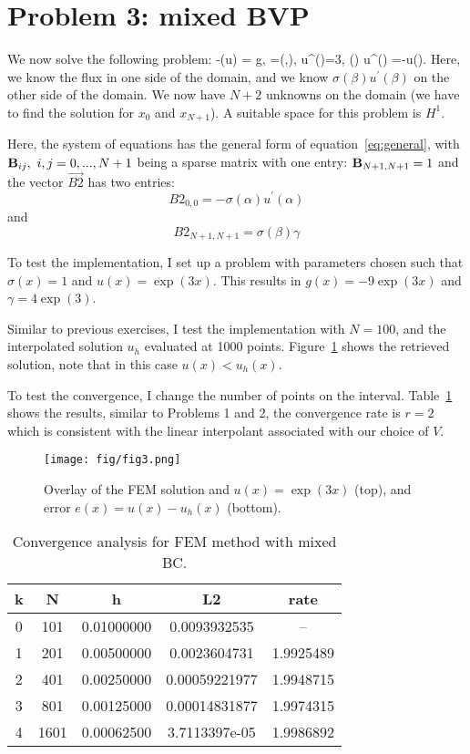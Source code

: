 \documentclass[10pt]{article}
\def\up#1{ #1^{\prime}}
\begin{document}
\section{Problem 3: mixed BVP}
We now solve the following problem:
\beq
-\nabla\cdot(\sigma\nabla u) = g, \Omega=(\alpha,\beta), \up{u}(\alpha)=3, \sigma(\beta)\up{u}(\beta) =\gamma -u(\beta).
\label{eq:Robin}
\eeq
Here, we know the flux in one side of the domain, and we know $\sigma(\beta)\up{u}(\beta)$ on the other side of the domain. 
We now have $N+2$ unknowns on the domain (we have to find the solution for $x_0$ and $x_{N+1}$). A suitable space
for this problem is $H^1$.

Here, the system of equations has the general form of equation~\ref{eq:general}, with 
${\bf B}_{ij},\text{  }i,j=0,...,N+1$ being a sparse matrix with one entry: ${\bf B}_{N+1,N+1} = 1$ 
and the vector $\vec{B2}$ has two entries:
\[
B2_{0,0} = -\sigma(\alpha)\up{u}(\alpha)
\]
and
\[
B2_{N+1,N+1} = \sigma(\beta)\gamma
\]


To test the implementation, I set up a problem with parameters chosen such that $\sigma(x)=1$ and $u(x) =\exp(3x)$. This
results in $g(x) = -9\exp(3x)$ and $\gamma=4\exp(3)$.

Similar to previous exercises, I test the implementation with $N=100$, and the interpolated solution $u_h$ evaluated
at 1000 points. Figure~\ref{fig:fig3} shows the retrieved solution, note that in this case $u(x) < u_h(x)$. 


To test the convergence, I change the number of points on the interval. Table~\ref{tab:table3} shows the results,
similar to Problems 1 and 2, the convergence rate is $r=2$ which is consistent with the linear interpolant
associated with our choice of $V$. 

\begin{figure}
\centering
\texttt{[image: fig/fig3.png]}
\caption{Overlay of the FEM solution and $u(x)= \exp(3x)$ (top), and error $e(x) = u(x)-u_h(x)$ (bottom).}
\label{fig:fig3}
\end{figure}

\begin{table}
\centering
  \begin{tabular}{c | c | c | c | c}
k&   N &      h    &     L2    &     rate      \\ \hline
0&  101& 0.01000000& 0.0093932535&    --       \\ 
1&  201& 0.00500000& 0.0023604731&  1.9925489  \\
2&  401& 0.00250000& 0.00059221977&  1.9948715 \\ 
3&  801& 0.00125000& 0.00014831877&  1.9974315 \\ 
4& 1601& 0.00062500& 3.7113397e-05&  1.9986892
  \end{tabular}
\caption{Convergence analysis for FEM method with mixed BC.}
\label{tab:table3}
\end{table}
\end{document}
